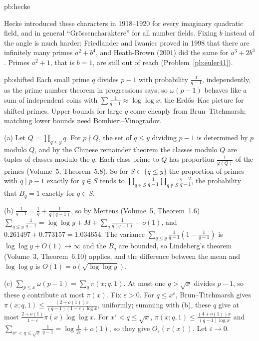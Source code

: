 \begin{solution}{pb:hecke}

\leads Hecke introduced these characters in 1918--1920 for every imaginary quadratic field, and in general ``Grössencharaktere'' for all number fields. Fixing $b$ instead of the angle is
much harder: Friedlander and Iwaniec proved in 1998 that there are infinitely many primes $a^2+b^4$, and Heath-Brown (2001) did the same for $a^3+2b^3$. Primes $a^2+1$, that
is $b=1$, are still out of reach (Problem~\ref{pb:euler41}).
\end{solution}

\begin{solution}{pb:shifted}
\idea Each small prime $q$ divides $p-1$ with probability $\frac1{q-1}$, independently, as the prime number theorem in progressions says; so $\omega(p-1)$ behaves like a sum of independent
coins with $\sum\frac1{q-1}\approx\log\log x$, the Erd\H os--Kac picture for shifted primes. Upper bounds for large $q$ come cheaply from Brun--Titchmarsh; matching lower bounds
need Bombieri--Vinogradov.

\writeup (a) Let $Q=\prod_{q\le y}q$. For $p\nmid Q$, the set of $q\le y$ dividing $p-1$ is determined by $p$ modulo $Q$, and by the Chinese remainder theorem the classes modulo $Q$ are
tuples of classes modulo the $q$. Each class prime to $Q$ has proportion $\frac1{\varphi(Q)}$ of the primes (Volume~5, Theorem~5.8). So for $S\subset\{q\le y\}$ the proportion of primes with
$q\mid p-1$ exactly for $q\in S$ tends to $\prod_{q\in S}\frac1{q-1}\prod_{q\notin S}\frac{q-2}{q-1}$, the probability that $B_q=1$ exactly for $q\in S$.

(b) $\frac1{q-1}=\frac1q+\frac1{q(q-1)}$, so by Mertens (Volume~5, Theorem~1.6) $\sum_{q\le y}\frac1{q-1}=\log\log y+M+\sum_q\frac1{q(q-1)}+o(1)$, and
$0.261497+0.773157=1.034654$. The variance $\sum_{q\le y}\frac1{q-1}(1-\frac1{q-1})$ is $\log\log y+O(1)\to\infty$ and the $B_q$ are bounded, so Lindeberg's theorem (Volume~3,
Theorem~6.10) applies, and the difference between the mean and $\log\log y$ is $O(1)=o(\sqrt{\log\log y})$.

(c) $\sum_{p\le x}\omega(p-1)=\sum_q\pi(x;q,1)$. At most one $q>\sqrt x$ divides $p-1$, so these $q$ contribute at most $\pi(x)$. Fix $\varepsilon>0$. For $q\le x^\varepsilon$,
Brun--Titchmarsh gives $\pi(x;q,1)\le\frac{(2+o(1))x}{(q-1)(1-\varepsilon)\log x}$, uniformly; summing with (b), these $q$ give at most $\frac{2+o(1)}{1-\varepsilon}\pi(x)\log\log x$. For
$x^\varepsilon<q\le\sqrt x$, $\pi(x;q,1)\le\frac{(4+o(1))x}{(q-1)\log x}$ and $\sum_{x^\varepsilon<q\le\sqrt x}\frac1{q-1}=\log\frac1{2\varepsilon}+o(1)$, so they give $O_\varepsilon(\pi(x))$. Let $\varepsilon\to0$.


\end{solution}
